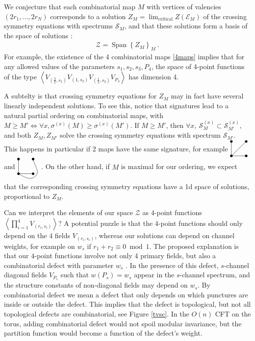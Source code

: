 \documentclass[12pt, a4paper]{article}
\newcommand{\vertices}{
\coordinate (base) at (0, 1);
\draw (0, 0) node[fill, circle, minimum size = 1.3mm, inner sep = 0]{};
  \draw (3, 0) node[fill, circle, minimum size = 1.3mm, inner sep = 0]{};
  \draw (0, 3) node[fill, circle, minimum size = 1.3mm, inner sep = 0]{};
  \draw (3, 3) node[fill, circle, minimum size = 1.3mm, inner sep = 0]{};
}
\theoremstyle{break}
\begin{document}
We conjecture that each combinatorial map $M$ with vertices of valencies $(2r_1,\dots, 2r_N)$ corresponds to a solution $Z_M = \lim_\text{critical} Z(\mathcal{E}_M)$ of the crossing symmetry equations with spectrums $\mathcal{S}_M$, and that these solutions form a basis of the space of solutions \cite{gjnrs23}:
\begin{align}
 \mathcal{Z} = \operatorname{Span}\left\{ Z_M\right\}_{M}\  .
\end{align}
For example, the existence of the 4 combinatorial maps
\eqref{4maps} implies that for any allowed values of the parameters $s_1,s_2,s_3,P_4$, the space of 4-point functions of the type $\left<V_{(\frac32,s_1)}V_{(1,s_2)}V_{(\frac12,s_3)}V_{P_4}\right>$ has dimension 4. 

A subtelty is that crossing symmetry equations for $Z_M$ may in fact have several linearly independent solutions. To see this, notice that signatures lead to a natural partial ordering on combinatorial maps, with $M\geq M' \iff \forall x, \sigma^{(x)}(M)\geq \sigma^{(x)}(M')$. If $M\geq M'$, then $\forall x, \ \mathcal{S}_M^{(x)} \subset \mathcal{S}_{M'}^{(x)}$, and both $Z_M,Z_{M'}$ solve the crossing symmetry equations with spectrum $\mathcal{S}_{M'}$. This happens in particular if 2 maps have the same signature, for example 
$
\begin{tikzpicture}[baseline=(base), scale = .25]
 \vertices
  \draw (0, 0) -- (0, 3);
  \draw (0, 0) -- (3, 3);
  \draw (0, 0) -- (3, 0);
 \end{tikzpicture}
$ and $
 \begin{tikzpicture}[baseline=(base), scale = .25]
 \vertices
  \draw (0, 0) -- (3, 0);
  \draw (0, 0) -- (0, 3);
  \draw (0, 0) to [out = -30, in = -135] (3.5, -.5) to [out = 45, in = -80] (3, 3);
  \end{tikzpicture}
$. On the other hand, if $M$ is maximal for our ordering, we expect that the corresponding crossing symmetry equations have a 1d space of solutions, proportional to $Z_M$. 

Can we interpret the elements of our space $\mathcal{Z}$ as $4$-point functions $\left<\prod_{i=1}^4 V_{(r_i,s_i)}\right>$? A potential puzzle is that the 4-point functions should only depend on the 4 fields $V_{(r_i,s_i)}$, whereas our solutions can depend on channel weights, for example on $w_s$ if $r_1+r_2\equiv 0 \bmod 1$. The proposed explanation is that our $4$-point functions involve not only 4 primary fields, but also a combinatorial defect with parameter $w_s$ \cite{rib22}. In the presence of this defect, $s$-channel diagonal fields $V_{P_s}$ such that $w(P_s)=w_s$ appear in the $s$-channel spectrum, and the structure constants of non-diagonal fields may depend on $w_s$. By combinatorial defect we mean a defect that only depends on which punctures are inside or outside the defect. This implies that the defect is topological, but not all topological defects are combinatorial, see Figure \eqref{tvsc}. In the $O(n)$ CFT on the torus, adding combinatorial defect would not spoil modular invariance, but the partition function would become a function of the defect's weight. 
\end{document}
